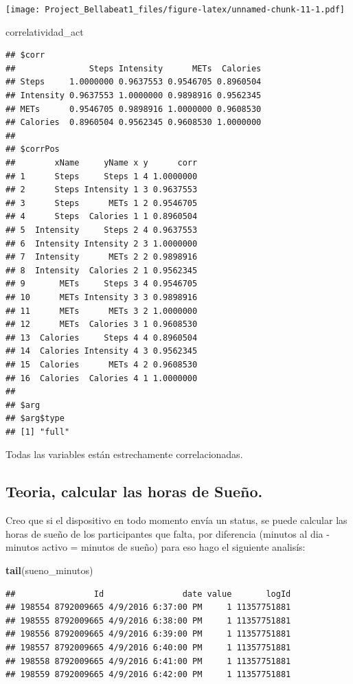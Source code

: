 \documentclass[
]{article}
\newenvironment{Shaded}{\begin{snugshade}}{\end{snugshade}}
\newcommand{\FunctionTok}[1]{\textcolor[rgb]{0.13,0.29,0.53}{\textbf{#1}}}
\newcommand{\NormalTok}[1]{#1}
\begin{document}
\texttt{[image: Project\_Bellabeat1\_files/figure-latex/unnamed-chunk-11-1.pdf]}

\begin{Shaded}
\begin{Highlighting}[]
\NormalTok{correlatividad\_act}
\end{Highlighting}
\end{Shaded}

\begin{verbatim}
## $corr
##               Steps Intensity      METs  Calories
## Steps     1.0000000 0.9637553 0.9546705 0.8960504
## Intensity 0.9637553 1.0000000 0.9898916 0.9562345
## METs      0.9546705 0.9898916 1.0000000 0.9608530
## Calories  0.8960504 0.9562345 0.9608530 1.0000000
## 
## $corrPos
##        xName     yName x y      corr
## 1      Steps     Steps 1 4 1.0000000
## 2      Steps Intensity 1 3 0.9637553
## 3      Steps      METs 1 2 0.9546705
## 4      Steps  Calories 1 1 0.8960504
## 5  Intensity     Steps 2 4 0.9637553
## 6  Intensity Intensity 2 3 1.0000000
## 7  Intensity      METs 2 2 0.9898916
## 8  Intensity  Calories 2 1 0.9562345
## 9       METs     Steps 3 4 0.9546705
## 10      METs Intensity 3 3 0.9898916
## 11      METs      METs 3 2 1.0000000
## 12      METs  Calories 3 1 0.9608530
## 13  Calories     Steps 4 4 0.8960504
## 14  Calories Intensity 4 3 0.9562345
## 15  Calories      METs 4 2 0.9608530
## 16  Calories  Calories 4 1 1.0000000
## 
## $arg
## $arg$type
## [1] "full"
\end{verbatim}

Todas las variables están estrechamente correlacionadas.

\subsection{Teoria, calcular las horas de
Sueño.}\label{teoria-calcular-las-horas-de-sueuxf1o.}

Creo que si el dispositivo en todo momento envía un status, se puede
calcular las horas de sueño de los participantes que falta, por
diferencia (minutos al dia - minutos activo = minutos de sueño) para eso
hago el siguiente analisís:

\begin{Shaded}
\begin{Highlighting}[]
\FunctionTok{tail}\NormalTok{(sueno\_minutos)}
\end{Highlighting}
\end{Shaded}

\begin{verbatim}
##                Id                date value       logId
## 198554 8792009665 4/9/2016 6:37:00 PM     1 11357751881
## 198555 8792009665 4/9/2016 6:38:00 PM     1 11357751881
## 198556 8792009665 4/9/2016 6:39:00 PM     1 11357751881
## 198557 8792009665 4/9/2016 6:40:00 PM     1 11357751881
## 198558 8792009665 4/9/2016 6:41:00 PM     1 11357751881
## 198559 8792009665 4/9/2016 6:42:00 PM     1 11357751881
\end{verbatim}
\end{document}
